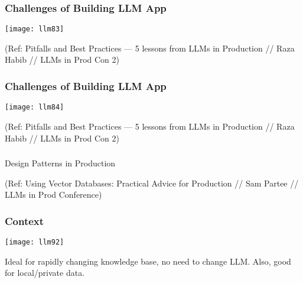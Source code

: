 \begin{frame}[fragile]\frametitle{Challenges of Building LLM App}


\begin{center}
\texttt{[image: llm83]}

\end{center}

{\tiny (Ref: Pitfalls and Best Practices — 5 lessons from LLMs in Production // Raza Habib // LLMs in Prod Con 2)}
\end{frame}

\begin{frame}[fragile]\frametitle{Challenges of Building LLM App}


\begin{center}
\texttt{[image: llm84]}

\end{center}

{\tiny (Ref: Pitfalls and Best Practices — 5 lessons from LLMs in Production // Raza Habib // LLMs in Prod Con 2)}
\end{frame}


\begin{frame}[fragile]\frametitle{}
\begin{center}
{\Large Design Patterns in Production}

{\tiny (Ref: Using Vector Databases: Practical Advice for Production // Sam Partee // LLMs in Prod Conference)}

\end{center}
\end{frame}

\begin{frame}[fragile]\frametitle{Context}


\begin{center}
\texttt{[image: llm92]}

\end{center}

Ideal for rapidly changing knowledge base, no need to change LLM. Also, good for local/private data.

\end{frame}

